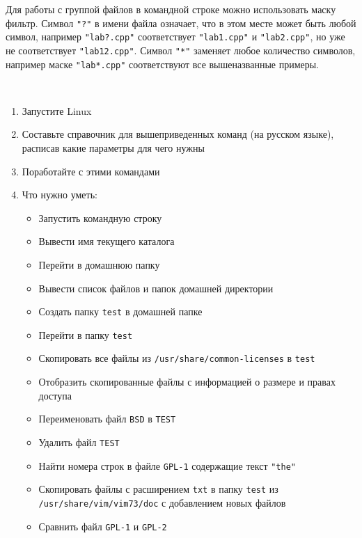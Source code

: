 \documentclass[a4paper,12pt]{article}
\begin{document}
  \begin{flushleft}
    Для работы с группой файлов в командной строке можно использовать маску фильтр. Символ \texttt{"?"} в имени файла означает, что в этом месте может быть любой символ, например \texttt{"lab?.cpp"} соответствует \texttt{"lab1.cpp"} и \texttt{"lab2.cpp"}, но уже не соответствует \texttt{"lab12.cpp"}. Символ \texttt{"*"} заменяет любое количество символов, например маске \texttt{"lab*.cpp"} соответствуют все вышеназванные примеры.
  \end{flushleft}

  \newpage

  \begin{flushleft}
     \\[0.5em]
    \begin{enumerate}
      \item Запустите Linux
      \item Составьте справочник для вышеприведенных команд (на русском языке), расписав какие параметры для чего нужны
      \item Поработайте с этими командами
      \item Что нужно уметь:
      \begin{itemize}
        \item Запустить командную строку
        \item Вывести имя текущего каталога
        \item Перейти в домашнюю папку
        \item Вывести список файлов и папок домашней директории
        \item Создать папку \texttt{test} в домашней папке
        \item Перейти в папку \texttt{test}
        \item Скопировать все файлы из \texttt{/usr/share/common-licenses} в \texttt{test}
        \item Отобразить скопированные файлы с информацией о размере и правах доступа
        \item Переименовать файл \texttt{BSD} в \texttt{TEST}
        \item Удалить файл \texttt{TEST}
        \item Найти номера строк в файле \texttt{GPL-1} содержащие текст \texttt{"the"}
        \item Скопировать файлы с расширением \texttt{txt} в папку \texttt{test} из \texttt{/usr/share/vim/vim73/doc} с добавлением новых файлов
        \item Сравнить файл \texttt{GPL-1} и \texttt{GPL-2}

\end{itemize}
\end{enumerate}
\end{flushleft}
\end{document}
